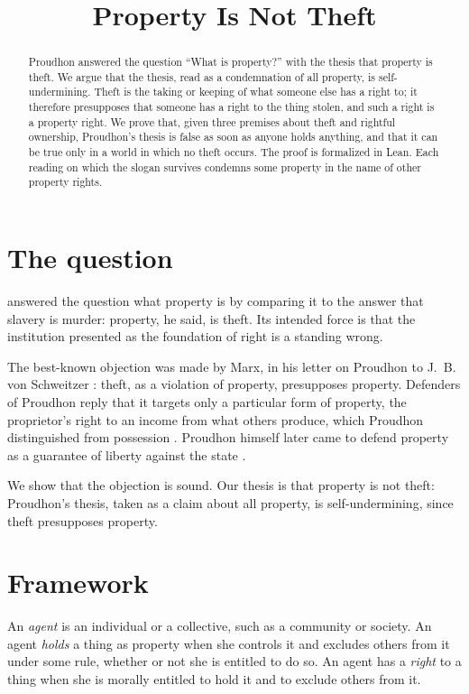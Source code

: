 \documentclass{situationist-preprint}
\title{Property Is Not Theft}
\begin{document}
\maketitle

\begin{abstract}
Proudhon answered the question \enquote{What is property?} with the thesis that property is theft. We argue that the thesis, read as a condemnation of all property, is self-undermining. Theft is the taking or keeping of what someone else has a right to; it therefore presupposes that someone has a right to the thing stolen, and such a right is a property right. We prove that, given three premises about theft and rightful ownership, Proudhon's thesis is false as soon as anyone holds anything, and that it can be true only in a world in which no theft occurs. The proof is formalized in Lean. Each reading on which the slogan survives condemns some property in the name of other property rights.
\end{abstract}

\section{The question}

\citet[ch.~1]{Proudhon1840} answered the question what property is by comparing it to the answer that slavery is murder: property, he said, is theft. Its intended force is that the institution presented as the foundation of right is a standing wrong.

The best-known objection was made by Marx, in his letter on Proudhon to J.~B. von Schweitzer \citep{Marx1865}: theft, as a violation of property, presupposes property. Defenders of Proudhon reply that it targets only a particular form of property, the proprietor's right to an income from what others produce, which Proudhon distinguished from possession \citep[chs.~2--4]{Proudhon1840}. Proudhon himself later came to defend property as a guarantee of liberty against the state \citep{Proudhon1866}.

We show that the objection is sound. Our thesis is that property is not theft: Proudhon's thesis, taken as a claim about all property, is self-undermining, since theft presupposes property.

\section{Framework}

\begin{definition}\label{d:basic}
An \emph{agent} is an individual or a collective, such as a community or society. An agent \emph{holds} a thing as property when she controls it and excludes others from it under some rule, whether or not she is entitled to do so. An agent has a \emph{right} to a thing when she is morally entitled to hold it and to exclude others from it.
\end{definition}
\end{document}
